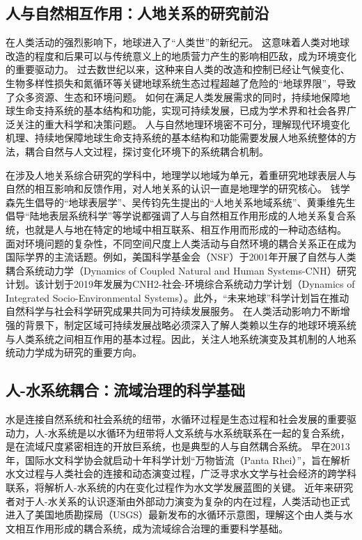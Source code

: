 \subsection{人与自然相互作用：人地关系的研究前沿}

在人类活动的强烈影响下，地球进入了“人类世”的新纪元。
这意味着人类对地球改造的程度和后果可以与传统意义上的地质营力产生的影响相匹敌，成为环境变化的重要驱动力\cite{lenton2019, lewis2015, lewis2018}。
过去数世纪以来，这种来自人类的改造和控制已经让气候变化、生物多样性损失和氮循环等关键地球系统生态过程超越了危险的“地球界限”，导致了众多资源、生态和环境问题\cite{steffen2015}。
如何在满足人类发展需求的同时，持续地保障地球生命支持系统的基本结构和功能，实现可持续发展，已成为学术界和社会各界广泛关注的重大科学和决策问题\cite{wu2014}。
人与自然地理环境密不可分，理解现代环境变化机理、持续地保障地球生命支持系统的基本结构和功能需要发展人地系统整体的方法，耦合自然与人文过程，探讨变化环境下的系统耦合机制\cite{fu2015}。

在涉及人地关系综合研究的学科中，地理学以地域为单元，着重研究地球表层人与自然的相互影响和反馈作用，对人地关系的认识一直是地理学的研究核心\cite{wu1991}。
钱学森先生倡导的“地球表层学”、吴传钧先生提出的“人地关系地域系统”、黄秉维先生倡导“陆地表层系统科学”等学说都强调了人与自然相互作用形成的人地关系复合系统，也就是人与地在特定的地域中相互联系、相互作用而形成的一种动态结构。
面对环境问题的复杂性，不同空间尺度上人类活动与自然环境的耦合关系正在成为国际学界的主流话题。例如，美国科学基金会（NSF）于2001年开展了自然与人类耦合系统动力学（Dynamics of Coupled Natural and Human Systems-CNH）研究计划。该计划于2019年发展为CNH2-社会-环境综合系统动力学计划（Dynamics of Integrated Socio-Environmental Systems）。此外，“未来地球”科学计划旨在推动自然科学与社会科学研究成果共同为可持续发展服务\cite{fu2015}。
在人类活动影响力不断增强的背景下，制定区域可持续发展战略必须深入了解人类赖以生存的地球环境系统与人类系统之间相互作用的基本过程。因此，关注人地系统演变及其机制的人地系统动力学成为研究的重要方向\cite{fu2022}。

\subsection{人-水系统耦合：流域治理的科学基础}

水是连接自然系统和社会系统的纽带，水循环过程是生态过程和社会发展的重要驱动力，人-水系统是以水循环为纽带将人文系统与水系统联系在一起的复合系统，是在流域尺度紧密相连的开放巨系统，也是典型的人与自然耦合系统\cite{li2007}。
早在2013年，国际水文科学协会就启动十年科学计划“万物皆流（Panta Rhei）”，旨在解析水文过程与人类社会的连接和动态演变过程\cite{montanari2013}，广泛寻求水文学与社会经济的跨学科联系，将解析人-水系统的内在变化过程作为水文学发展蓝图的关键。
近年来研究者对于人-水关系的认识逐渐由外部动力演变为复杂的内在过程，人类活动也正式进入了美国地质勘探局（USGS）最新发布的水循环示意图\cite{abbott2019, abbott2019a}，理解这个由人类与水文相互作用形成的耦合系统，成为流域综合治理的重要科学基础。

